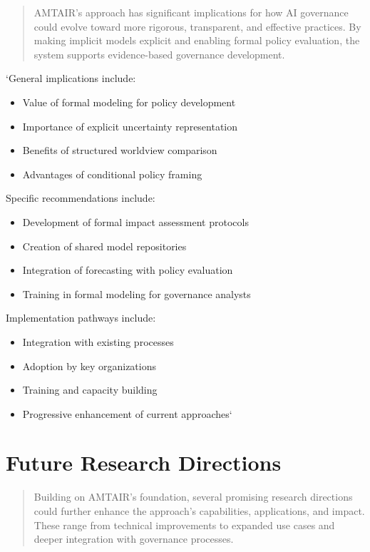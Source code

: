 \documentclass[]{book}
\providecommand{\tightlist}{%
  \setlength{\itemsep}{0pt}\setlength{\parskip}{0pt}}
\begin{document}
\begin{quote}
AMTAIR's approach has significant implications for how AI governance
could evolve toward more rigorous, transparent, and effective practices.
By making implicit models explicit and enabling formal policy
evaluation, the system supports evidence-based governance development.
\end{quote}

`General implications include:

\begin{itemize}
\tightlist
\item
  Value of formal modeling for policy development
\item
  Importance of explicit uncertainty representation
\item
  Benefits of structured worldview comparison
\item
  Advantages of conditional policy framing
\end{itemize}

Specific recommendations include:

\begin{itemize}
\tightlist
\item
  Development of formal impact assessment protocols
\item
  Creation of shared model repositories
\item
  Integration of forecasting with policy evaluation
\item
  Training in formal modeling for governance analysts
\end{itemize}

Implementation pathways include:

\begin{itemize}
\tightlist
\item
  Integration with existing processes
\item
  Adoption by key organizations
\item
  Training and capacity building
\item
  Progressive enhancement of current approaches`
\end{itemize}

\section{Future Research Directions}\label{sec-future-research}

\begin{quote}
Building on AMTAIR's foundation, several promising research directions
could further enhance the approach's capabilities, applications, and
impact. These range from technical improvements to expanded use cases
and deeper integration with governance processes.
\end{quote}
\end{document}
